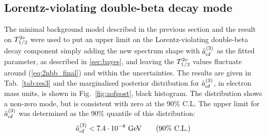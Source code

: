 \subsection*{Lorentz-violating double-beta decay mode}
The minimal background model described in the previous section and the result on $T_{1/2}^{2\nu}$ were used to put an upper limit on the Lorentz-violating double-beta decay component simply adding the new spectrum shape with $\mathring{a}_\text{of}^{(3)}$ as the fitted parameter, as described in \ref{sec:bayes}, and leaving the $T_{1/2}^{2\nu}$ values fluctuate around (\ref{eq:2nbb_final}) and within the uncertainties. The results are given in Tab.~\ref{tab:res3} and the marginalised posterior distribution for $\mathring{a}_\text{of}^{(3)}$, in electron mass units, is shown in Fig.~\ref{fig:aofpost}, black histogram. The distribution shows a non-zero mode, but is consistent with zero at the 90\% C.L. The upper limit for $\mathring{a}_\text{of}^{(3)}$ was determined as the 90\% quantile of this distribution:
\begin{equation}\mathring{a}_\text{of}^{(3)}<7.4\cdot10^{-8}\ \text{GeV}\qquad(\text{90\% C.L.})\label{eq:aoflimit}\end{equation}
